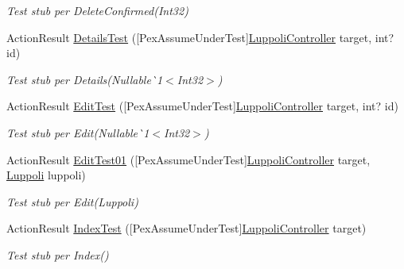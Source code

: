\begin{DoxyCompactItemize}
\begin{DoxyCompactList}\small\item\em Test stub per Delete\+Confirmed(\+Int32)\end{DoxyCompactList}\item 
Action\+Result \mbox{\hyperlink{class_brew_day2_1_1_controllers_1_1_tests_1_1_luppoli_controller_test_a9feeabe58f9a429fc08b9242abe988da}{Details\+Test}} (\mbox{[}Pex\+Assume\+Under\+Test\mbox{]}\mbox{\hyperlink{class_brew_day2_1_1_controllers_1_1_luppoli_controller}{Luppoli\+Controller}} target, int? id)
\begin{DoxyCompactList}\small\item\em Test stub per Details(Nullable\`{}1$<$Int32$>$)\end{DoxyCompactList}\item 
Action\+Result \mbox{\hyperlink{class_brew_day2_1_1_controllers_1_1_tests_1_1_luppoli_controller_test_a67cdff824b5a22e14ae77b31a08cfc5e}{Edit\+Test}} (\mbox{[}Pex\+Assume\+Under\+Test\mbox{]}\mbox{\hyperlink{class_brew_day2_1_1_controllers_1_1_luppoli_controller}{Luppoli\+Controller}} target, int? id)
\begin{DoxyCompactList}\small\item\em Test stub per Edit(Nullable\`{}1$<$Int32$>$)\end{DoxyCompactList}\item 
Action\+Result \mbox{\hyperlink{class_brew_day2_1_1_controllers_1_1_tests_1_1_luppoli_controller_test_ab291b8ada5729287040431f2881e12c2}{Edit\+Test01}} (\mbox{[}Pex\+Assume\+Under\+Test\mbox{]}\mbox{\hyperlink{class_brew_day2_1_1_controllers_1_1_luppoli_controller}{Luppoli\+Controller}} target, \mbox{\hyperlink{class_brew_day2_1_1_models_1_1_luppoli}{Luppoli}} luppoli)
\begin{DoxyCompactList}\small\item\em Test stub per Edit(\+Luppoli)\end{DoxyCompactList}\item 
Action\+Result \mbox{\hyperlink{class_brew_day2_1_1_controllers_1_1_tests_1_1_luppoli_controller_test_a3236d7beaf542519ce1e815457659512}{Index\+Test}} (\mbox{[}Pex\+Assume\+Under\+Test\mbox{]}\mbox{\hyperlink{class_brew_day2_1_1_controllers_1_1_luppoli_controller}{Luppoli\+Controller}} target)
\begin{DoxyCompactList}\small\item\em Test stub per Index()\end{DoxyCompactList}\end{DoxyCompactItemize}


